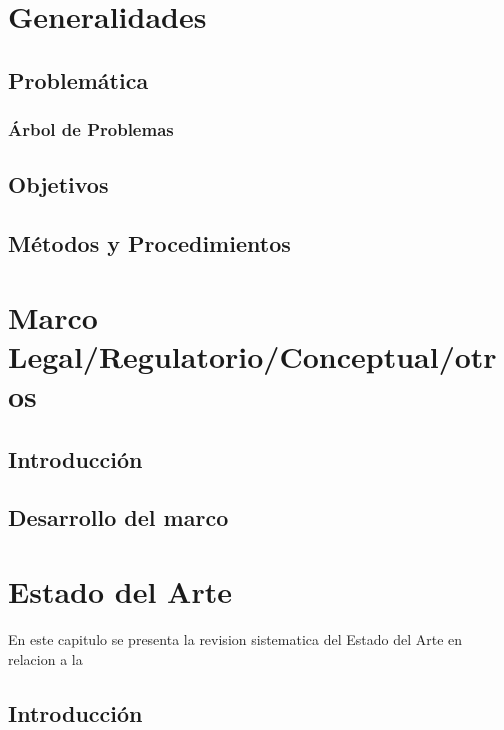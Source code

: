 \documentclass{report}
\begin{document}


\begin{abstract}

\end{abstract}

\tableofcontents

\cleardoublepage{}
\listoffigures

\cleardoublepage{}
\listoftables


\chapter{Generalidades}
\section{Problemática}
\subsection{Árbol de Problemas}
\section{Objetivos}
\section{Métodos y Procedimientos}

\chapter{Marco Legal/Regulatorio/Conceptual/otros}
\section{Introducción}
\section{Desarrollo del marco}


\chapter{Estado del Arte}

En este capitulo se presenta la revision sistematica del Estado del Arte en
relacion a la 

\section{Introducción}
\end{document}
